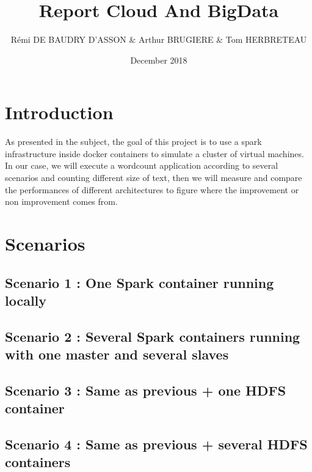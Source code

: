 \documentclass{article}
\title{Report Cloud And BigData}
\author{Rémi DE BAUDRY D'ASSON & Arthur BRUGIERE & Tom HERBRETEAU }
\date{December 2018}
\begin{document}
\maketitle

\section{Introduction}

As presented in the subject, the goal of this project is to use a spark infrastructure inside docker containers to simulate a cluster of virtual machines. \\

In our case, we will execute a wordcount application according to several scenarios and counting different size of text, then we will measure and compare the performances of different architectures to figure where the improvement or non improvement comes from.

\section{Scenarios}

\subsection{Scenario 1 : One Spark container running locally}

\subsection{Scenario 2 : Several Spark containers running with one master and several slaves}

\subsection{Scenario 3 : Same as previous + one HDFS container}

\subsection{Scenario 4 : Same as previous + several HDFS containers}
\end{document}
